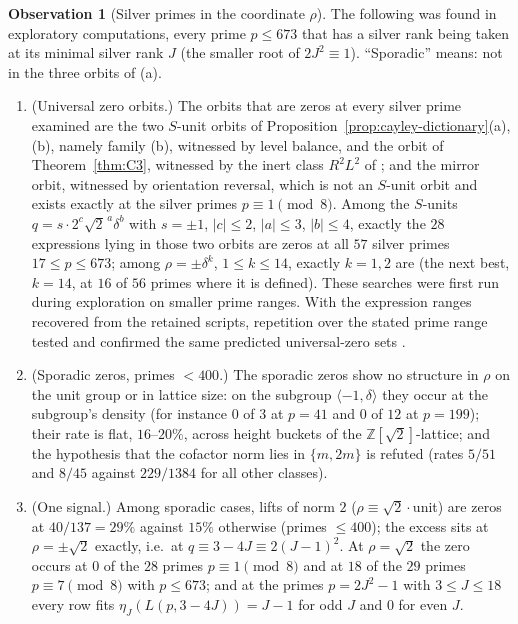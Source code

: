 \documentclass[11pt]{article}
\theoremstyle{definition}
\newtheorem{observation}[theorem]{Observation}
\newcommand{\Z}{\mathbb Z}
\begin{document}
\begin{observation}[Silver primes in the coordinate $\rho$]
\label{obs:rho-statistics}
The following was found in exploratory computations, every prime $p\leq673$ that has
a silver rank being taken at its minimal silver rank $J$ (the smaller
root of $2J^2\equiv1$).  ``Sporadic'' means: not in the three orbits of
(a).
\begin{enumerate}[label=(\alph*)]
\item \textup{(Universal zero orbits.)}  The orbits that are zeros at
every silver prime examined are the two $S$-unit orbits of
Proposition~\ref{prop:cayley-dictionary}(a),(b), namely family (b),
witnessed by level balance, and the orbit of Theorem~\ref{thm:C3},
witnessed by the inert class $R^2L^2$ of
\cite[Thm.~8.2(viii)]{LensChirality2026}; and the mirror orbit, witnessed
by orientation reversal, which is not an $S$-unit orbit and exists
exactly at the silver primes $p\equiv1\pmod8$.  Among the $S$-units
$q=s\cdot2^c\sqrt2^{\,a}\delta^{b}$ with $s=\pm1$, $|c|\leq2$, $|a|\leq3$,
$|b|\leq4$, exactly the $28$ expressions lying in those two orbits are
zeros at all $57$ silver primes $17\leq p\leq673$; among
$\rho=\pm\delta^k$, $1\leq k\leq14$, exactly $k=1,2$ are (the next best,
$k=14$, at $16$ of $56$ primes where it is defined).  These searches were
first run during exploration on smaller prime ranges.  With the expression
ranges recovered from the retained scripts, repetition over the stated
prime range tested and confirmed the same predicted universal-zero sets
\cite{LCrecord}.
\item \textup{(Sporadic zeros, primes $<400$.)}  The sporadic zeros show
no structure in $\rho$ on the unit group or in lattice size: on the
subgroup $\langle-1,\delta\rangle$ they occur at the subgroup's density
(for instance $0$ of $3$ at $p=41$ and $0$ of $12$ at $p=199$); their
rate is flat, $16$--$20\%$, across height buckets of the
$\Z[\sqrt2]$-lattice; and the hypothesis that the cofactor norm lies in
$\{m,2m\}$ is refuted (rates $5/51$ and $8/45$ against $229/1384$ for
all other classes).
\item \textup{(One signal.)}  Among sporadic cases, lifts of norm $2$
($\rho\equiv\sqrt2\cdot$unit) are zeros at $40/137=29\%$ against $15\%$
otherwise (primes $\leq400$); the excess sits at $\rho=\pm\sqrt2$
exactly, i.e.\ at $q\equiv3-4J\equiv2(J-1)^2$.  At $\rho=\sqrt2$ the
zero occurs at $0$ of the $28$ primes $p\equiv1\pmod8$ and at $18$ of the
$29$ primes $p\equiv7\pmod8$ with $p\leq673$; and at the primes
$p=2J^2-1$ with $3\leq J\leq18$ every row fits
$\eta_J(L(p,3-4J))=J-1$ for odd $J$ and $0$ for even $J$.
\end{enumerate}
\end{observation}
\end{document}
